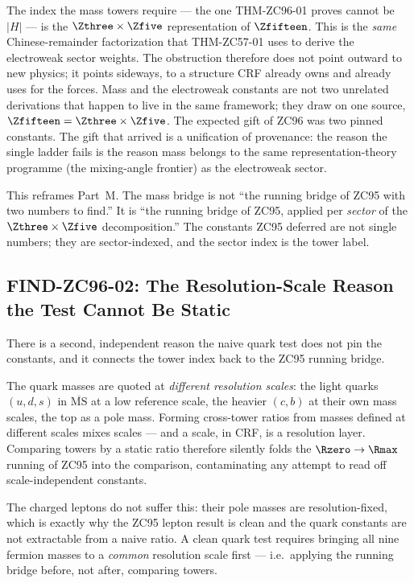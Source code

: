\documentclass[12pt, a4paper]{article}
\begin{document}
\begin{giftbox}[title={FIND-ZC96-01: Mass and Electroweak Structure Share One
  Source}]
The index the mass towers require --- the one THM-ZC96-01 proves cannot be
$|H|$ --- is the $\Zthree\times\Zfive$ representation of $\Zfifteen$. This is the
\emph{same} Chinese-remainder factorization that THM-ZC57-01 uses to derive the
electroweak sector weights. The obstruction therefore does not point outward to
new physics; it points sideways, to a structure CRF already owns and already
uses for the forces. Mass and the electroweak constants are not two unrelated
derivations that happen to live in the same framework; they draw on one source,
$\Zfifteen=\Zthree\times\Zfive$. The expected gift of ZC96 was two pinned
constants. The gift that arrived is a unification of provenance: the reason the
single ladder fails is the reason mass belongs to the same representation-theory
programme (the mixing-angle frontier) as the electroweak sector.
\end{giftbox}

This reframes Part~M. The mass bridge is not ``the running bridge of ZC95 with
two numbers to find.'' It is ``the running bridge of ZC95, applied per
\emph{sector} of the $\Zthree\times\Zfive$ decomposition.'' The constants ZC95
deferred are not single numbers; they are sector-indexed, and the sector index
is the tower label.

\subsection{FIND-ZC96-02: The Resolution-Scale Reason the Test Cannot Be Static}
\label{sec:scale-zc96}

There is a second, independent reason the naive quark test does not pin the
constants, and it connects the tower index back to the ZC95 running bridge.

\begin{formalbox}[title={FIND-ZC96-02: Tower Comparison Is Resolution-Dependent}]
The quark masses are quoted at \emph{different resolution scales}: the light
quarks $(u,d,s)$ in $\overline{\mathrm{MS}}$ at a low reference scale, the
heavier $(c,b)$ at their own mass scales, the top as a pole mass. Forming
cross-tower ratios from masses defined at different scales mixes scales --- and
a scale, in CRF, is a resolution layer. Comparing towers by a static ratio
therefore silently folds the $\Rzero\to\Rmax$ running of ZC95 into the
comparison, contaminating any attempt to read off scale-independent constants.

The charged leptons do not suffer this: their pole masses are
resolution-fixed, which is exactly why the ZC95 lepton result is clean and the
quark constants are not extractable from a naive ratio. A clean quark test
requires bringing all nine fermion masses to a \emph{common} resolution scale
first --- i.e.\ applying the running bridge before, not after, comparing towers.
\end{formalbox}
\end{document}

